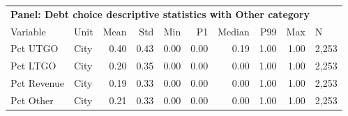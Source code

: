 \begin{table}[H]
\centering
\begin{tabular*}{\textwidth}{@{\extracolsep{\fill}}llrrrrrrrl}
\multicolumn{10}{l}{\textbf{Panel: Debt choice descriptive statistics with Other category}}\\

\addlinespace
  \toprule
Variable & Unit & Mean & Std & Min & P1 & Median & P99 & Max & N \\ 
  \hline
Pct UTGO & City & 0.40 & 0.43 & 0.00 & 0.00 & 0.19 & 1.00 & 1.00 & 2,253 \\ 
  Pct LTGO & City & 0.20 & 0.35 & 0.00 & 0.00 & 0.00 & 1.00 & 1.00 & 2,253 \\ 
  Pct Revenue & City & 0.19 & 0.33 & 0.00 & 0.00 & 0.00 & 1.00 & 1.00 & 2,253 \\ 
  Pct Other & City & 0.21 & 0.33 & 0.00 & 0.00 & 0.00 & 1.00 & 1.00 & 2,253 \\ 
   \hline
\end{tabular*}
\end{table}
